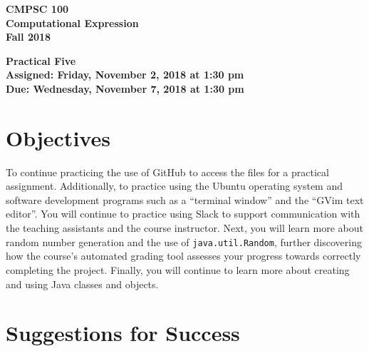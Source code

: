 \documentclass[11pt]{article}
\newcommand{\assignmentduedate}{November 7}
\newcommand{\assignmentassignedate}{November 2}
\newcommand{\assignmentnumber}{Five}
\newcommand{\labyear}{2018}
\newcommand{\labdueday}{Wednesday}
\newcommand{\labassignday}{Friday}
\newcommand{\labtime}{1:30 pm}
\newcommand{\assigneddate}{Assigned: \labassignday, \assignmentassignedate, \labyear{} at \labtime{}}
\newcommand{\duedate}{Due: \labdueday, \assignmentduedate, \labyear{} at \labtime{}}
\newcommand{\labtitle}[1]
{
  \begin{center}
    \begin{center}
      \bf
      CMPSC 100\\Computational Expression\\
      Fall 2018\\
      \medskip
    \end{center}
    \bf
    #1
  \end{center}
}
\begin{document}
\thispagestyle{empty}

\labtitle{Practical \assignmentnumber{} \\ \assigneddate{} \\ \duedate{}}

\section*{Objectives}

To continue practicing the use of GitHub to access the files for a practical
assignment. Additionally, to practice using the Ubuntu operating system and
software development programs such as a ``terminal window'' and the ``GVim text
editor''. You will continue to practice using Slack to support communication
with the teaching assistants and the course instructor. Next, you will learn
more about random number generation and the use of {\tt java.util.Random},
further discovering how the course's automated grading tool assesses your
progress towards correctly completing the project. Finally, you will continue to
learn more about creating and using Java classes and objects.

\section*{Suggestions for Success}
\end{document}
